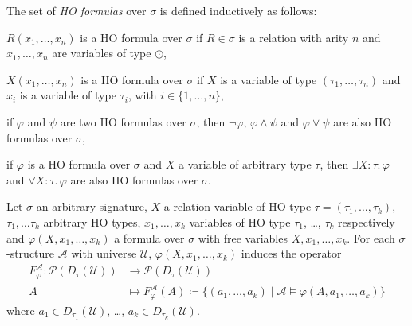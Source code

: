 \begin{frame}

\begin{definition}
The set of \emph{HO formulas} over $\sigma$ is defined inductively as follows:
\begin{compactitem}
\item $R(x_1, \dots, x_n)$ is a HO formula over $\sigma$ if $R \in \sigma$ is a relation with arity $n$ and
$x_1, \dots, x_n$ are variables of type $\odot$,
\item $X(x_1, \dots, x_n)$ is a HO formula over $\sigma$ if $X$ is a variable of type $(\tau_1, \dots, \tau_n)$
and $x_i$ is a variable of type $\tau_i$, with $i \in \{1, \dots, n\}$,
\item if $\varphi$ and $\psi$ are two HO formulas over $\sigma$, then $\neg\varphi$, $\varphi\wedge\psi$ and $\varphi
\vee \psi$ are also HO formulas over $\sigma$,
\item if $\varphi$ is a HO formula over $\sigma$ and $X$ a variable of arbitrary type $\tau$, then $\exists
X\colon\tau.\,\varphi$ and
$\forall X\colon\tau.\,\varphi$ are also HO formulas over $\sigma$.
\end{compactitem}
\end{definition}

\end{frame}

\begin{frame}

\begin{definition}
Let $\sigma$ an arbitrary signature, $X$ a relation variable of HO type $\tau = (\tau_1, \dots, \tau_k)$,
$\tau_1, \dots \tau_k$ arbitrary HO types, $x_1, \dots, x_k$ variables of HO type $\tau_1$, \dots, $\tau_k$
respectively and $\varphi(X, x_1, \dots, x_k)$ a formula over $\sigma$ with free variables $X, x_1,
\dots, x_k$. For each $\sigma$-structure $\mathcal{A}$ with universe $\mathcal{U}$, $\varphi(X, x_1, \dots, x_k)$
induces the operator
\begin{align*}
F_\varphi^\mathcal{A}\colon\mathscr{P}(D_\tau(\mathcal{U})) &\longrightarrow \mathscr{P}(D_\tau(\mathcal{U}))\\
A &\longmapsto F_\varphi^\mathcal{A}(A) \coloneqq \{(a_1, \dots, a_k) \mid \mathcal{A} \models \varphi(A, a_1,
\dots, a_k)\}
\end{align*}
where $a_1 \in D_{\tau_1}(\mathcal{U})$, \dots, $a_k \in D_{\tau_k}(\mathcal{U})$.
\end{definition}
\end{frame}

